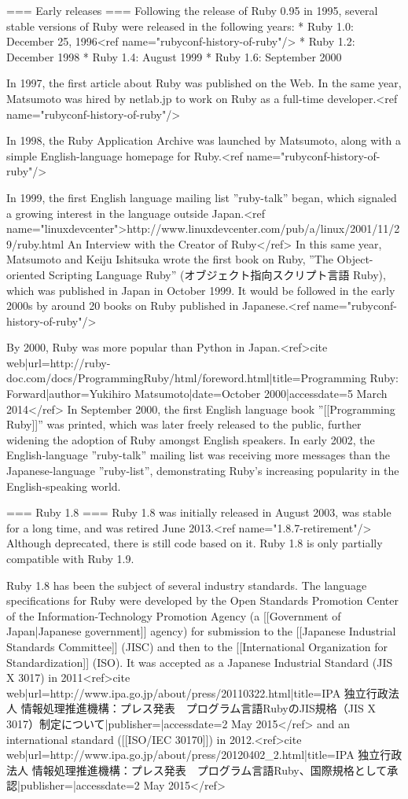 === Early releases ===
Following the release of Ruby 0.95 in 1995, several stable versions of Ruby were released in the following years:
* Ruby 1.0: December 25, 1996<ref name="rubyconf-history-of-ruby"/>
* Ruby 1.2: December 1998
* Ruby 1.4: August 1999
* Ruby 1.6: September 2000

In 1997, the first article about Ruby was published on the Web. In the same year, Matsumoto was hired by netlab.jp to work on Ruby as a full-time developer.<ref name="rubyconf-history-of-ruby"/>

In 1998, the Ruby Application Archive was launched by Matsumoto, along with a simple English-language homepage for Ruby.<ref name="rubyconf-history-of-ruby"/>

In 1999, the first English language mailing list ''ruby-talk'' began, which signaled a growing interest in the language outside Japan.<ref name="linuxdevcenter">http://www.linuxdevcenter.com/pub/a/linux/2001/11/29/ruby.html An Interview with the Creator of Ruby</ref> In this same year, Matsumoto and Keiju Ishitsuka wrote the first book on Ruby, ''The Object-oriented Scripting Language Ruby'' (オブジェクト指向スクリプト言語 Ruby), which was published in Japan in October 1999. It would be followed in the early 2000s by around 20 books on Ruby published in Japanese.<ref name="rubyconf-history-of-ruby"/>

By 2000, Ruby was more popular than Python in Japan.<ref>{{cite web|url=http://ruby-doc.com/docs/ProgrammingRuby/html/foreword.html|title=Programming Ruby: Forward|author=Yukihiro Matsumoto|date=October 2000|accessdate=5 March 2014}}</ref> In September 2000, the first English language book ''[[Programming Ruby]]'' was printed, which was later freely released to the public, further widening the adoption of Ruby amongst English speakers. In early 2002, the English-language ''ruby-talk'' mailing list was receiving more messages than the Japanese-language ''ruby-list'', demonstrating Ruby's increasing popularity in the English-speaking world.

=== Ruby 1.8 ===
Ruby 1.8 was initially released in August 2003, was stable for a long time, and was retired June 2013.<ref name="1.8.7-retirement"/> Although deprecated, there is still code based on it. Ruby 1.8 is only partially compatible with Ruby 1.9.

Ruby 1.8 has been the subject of several industry standards. The language specifications for Ruby were developed by the Open Standards Promotion Center of the Information-Technology Promotion Agency (a [[Government of Japan|Japanese government]] agency) for submission to the [[Japanese Industrial Standards Committee]] (JISC) and then to the [[International Organization for Standardization]] (ISO). It was accepted as a Japanese Industrial Standard (JIS X 3017) in 2011<ref>{{cite web|url=http://www.ipa.go.jp/about/press/20110322.html|title=IPA 独立行政法人 情報処理推進機構：プレス発表　プログラム言語RubyのJIS規格（JIS X 3017）制定について|publisher=|accessdate=2 May 2015}}</ref> and an international standard ([[ISO/IEC 30170]]) in 2012.<ref>{{cite web|url=http://www.ipa.go.jp/about/press/20120402_2.html|title=IPA 独立行政法人 情報処理推進機構：プレス発表　プログラム言語Ruby、国際規格として承認|publisher=|accessdate=2 May 2015}}</ref>

